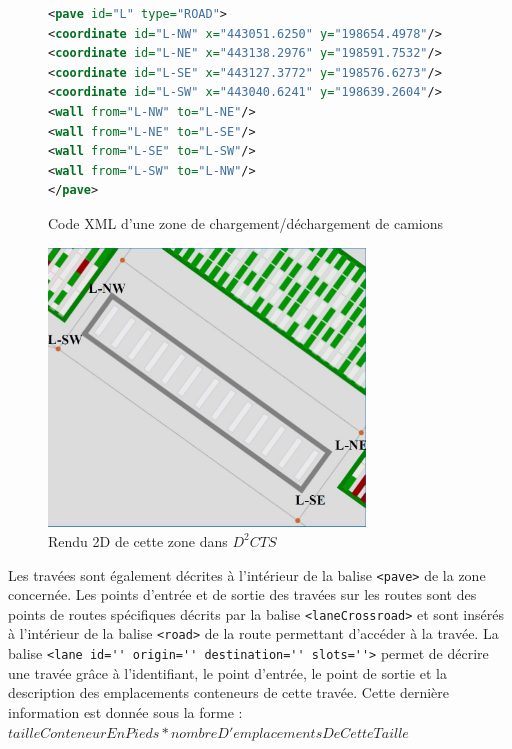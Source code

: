 \begin{subfigures}
\begin{figure}
\centering
 \begin{lstlisting}[language=XML]
<pave id="L" type="ROAD">
<coordinate id="L-NW" x="443051.6250" y="198654.4978"/>
<coordinate id="L-NE" x="443138.2976" y="198591.7532"/>
<coordinate id="L-SE" x="443127.3772" y="198576.6273"/>
<coordinate id="L-SW" x="443040.6241" y="198639.2604"/>
<wall from="L-NW" to="L-NE"/>
<wall from="L-NE" to="L-SE"/>
<wall from="L-SE" to="L-SW"/>
<wall from="L-SW" to="L-NW"/>
</pave>
\end{lstlisting}
\caption{Code XML d'une zone de chargement/déchargement de camions}
\end{figure}

\begin{figure}[h]
  \centering
  \includegraphics[width=0.75\textwidth]{chapitres/simulation/pave.jpg}
  \caption{Rendu 2D de cette zone dans $D^2CTS$ }
\end{figure}
\label{fig:simulation:pave}
\end{subfigures}

Les travées sont également décrites à l'intérieur de la balise \verb!<pave>! de la zone concernée. Les points d'entrée et de sortie des travées sur les routes sont des points de routes spécifiques décrits par la balise \verb!<laneCrossroad>! et sont insérés à l'intérieur de la balise \verb!<road>! de la route permettant d'accéder à la travée.
La balise \verb!<lane id='' origin='' destination='' slots=''>! permet de décrire une travée grâce à l'identifiant, le point d'entrée, le point de sortie et la description des emplacements conteneurs de cette travée. Cette dernière information est donnée sous la forme : $tailleConteneurEnPieds*nombreD'emplacementsDeCetteTaille$

